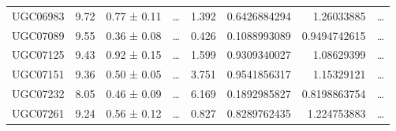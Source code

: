 \documentclass[reprint,%
 amsmath,amssymb,
 aps,
]{revtex4-1}
\begin{document}
\begin{table}[]
\begin{tabular}{cccccrrc}
\rowcolor[HTML]{F3F3F3} 
UGC06983             & 9.72                      & 0.77 ± 0.11           & …                      & 1.392                                                        & 0.6426884294                                                          & 1.26033885                                                            & …                                                             \\
\rowcolor[HTML]{F3F3F3} 
UGC07089             & 9.55                      & 0.36 ± 0.08           & …                      & 0.426                                                        & 0.1088993089                                                          & 0.9494742615                                                          & …                                                             \\
\rowcolor[HTML]{F3F3F3} 
UGC07125             & 9.43                      & 0.92 ± 0.15           & …                      & 1.599                                                        & 0.9309340027                                                          & 1.08629399                                                            & …                                                             \\
\rowcolor[HTML]{F3F3F3} 
UGC07151             & 9.36                      & 0.50 ± 0.05           & …                      & 3.751                                                        & 0.9541856317                                                          & 1.15329121                                                            & …                                                             \\
\rowcolor[HTML]{F3F3F3} 
UGC07232             & 8.05                      & 0.46 ± 0.09           & …                      & 6.169                                                        & 0.1892985827                                                          & 0.8198863754                                                          & …                                                             \\
\rowcolor[HTML]{F3F3F3} 
UGC07261             & 9.24                      & 0.56 ± 0.12           & …                      & 0.827                                                        & 0.8289762435                                                          & 1.224753883                                                           & …                                                             \\

\end{tabular}
\end{table}
\end{document}
